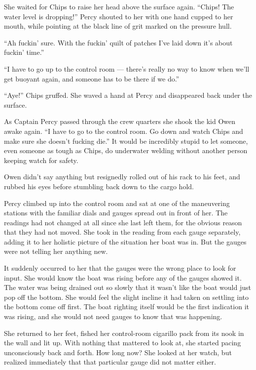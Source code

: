 \documentclass[]{article}
\begin{document}
\begin{multicols}{2}
She waited for Chips to raise her head above the surface again. ``Chips!
The water level is dropping!'' Percy shouted to her with one hand cupped
to her mouth, while pointing at the black line of grit marked on the
pressure hull.

``Ah fuckin' sure. With the fuckin' quilt of patches I've laid down it's
about fuckin' time.''

``I have to go up to the control room --- there's really no way to know
when we'll get buoyant again, and someone has to be there if we do.''

``Aye!'' Chips gruffed. She waved a hand at Percy and disappeared back
under the surface.

As Captain Percy passed through the crew quarters she shook the kid Owen
awake again. ``I have to go to the control room. Go down and watch Chips
and make sure she doesn't fucking die.'' It would be incredibly stupid
to let someone, even someone as tough as Chips, do underwater welding
without another person keeping watch for safety.

Owen didn't say anything but resignedly rolled out of his rack to his
feet, and rubbed his eyes before stumbling back down to the cargo hold.

Percy climbed up into the control room and sat at one of the maneuvering
stations with the familiar dials and gauges spread out in front of her.
The readings had not changed at all since she last left them, for the
obvious reason that they had not moved. She took in the reading from
each gauge separately, adding it to her holistic picture of the
situation her boat was in. But the gauges were not telling her anything
new.

It suddenly occurred to her that the gauges were the wrong place to look
for input. She would know the boat was rising before any of the gauges
showed it. The water was being drained out so slowly that it wasn't like
the boat would just pop off the bottom. She would feel the slight
incline it had taken on settling into the bottom come off first. The
boat righting itself would be the first indication it was rising, and
she would not need gauges to know that was happening.

She returned to her feet, fished her control-room cigarillo pack from
its nook in the wall and lit up. With nothing that mattered to look at,
she started pacing unconsciously back and forth. How long now? She
looked at her watch, but realized immediately that that particular gauge
did not matter either.


\end{multicols}
\end{document}
